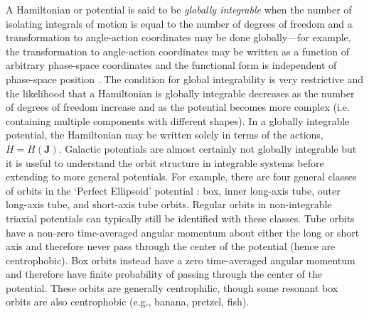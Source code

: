 \documentclass{mn2e}
\newcommand{\chchchanges}[1]{#1}
\begin{document}
A Hamiltonian or potential is said to be \emph{globally integrable} when the number of isolating integrals of motion is equal to the number of degrees of freedom and a transformation to angle-action coordinates may be done globally---for example, the transformation to angle-action coordinates may be written as a function of arbitrary phase-space coordinates and the functional form is independent of phase-space position \citep[e.g.,][]{goldstein80}. The condition for global integrability is very restrictive and the likelihood that a Hamiltonian is globally integrable decreases as the number of degrees of freedom increase \citep[e.g.,][]{lichtenberg83} and as the potential becomes more complex (i.e. containing multiple components with different shapes). In a globally integrable potential, the Hamiltonian may be written solely in terms of the actions, $H = H(\boldsymbol{J})$. Galactic potentials are almost certainly not globally integrable but it is useful to understand the orbit structure in integrable systems before extending to more general potentials. \chchchanges{For example, there are four general classes of orbits in the `Perfect Ellipsoid' potential \citep[an integrable triaxial potential and special case of the St\"ackel potential; see, e.g.,][]{kuzmin73, deZeeuw85}: box, inner long-axis tube, outer long-axis tube, and short-axis tube orbits. Regular orbits in non-integrable triaxial potentials can typically still be identified with these classes. Tube orbits have a non-zero time-averaged angular momentum about either the long or short axis and therefore never pass through the center of the potential (hence are centrophobic). Box orbits instead have a zero time-averaged angular momentum and therefore have finite probability of passing through the center of the potential. These orbits are generally centrophilic, though some resonant box orbits are also centrophobic (e.g., banana, pretzel, fish).}
\end{document}
